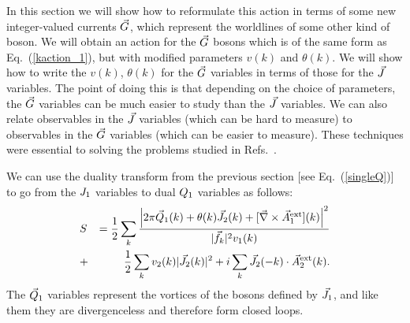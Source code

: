 In this section we will show how to reformulate this action in terms of some new integer-valued currents $\vec{G}$, which represent the worldlines of some other kind of boson. We will obtain an action for the $\vec{G}$ bosons which is of the same form as Eq.~(\ref{kaction_1}), but with modified parameters $v(k)$ and $\theta(k)$. We will show how to write the $v(k)$, $\theta(k)$ for the $\vec{G}$ variables in terms of those for the $\vec{J}$ variables. The point of doing this is that depending on the choice of parameters, the $\vec{G}$ variables can be much easier to study than the $\vec{J}$ variables. We can also relate observables in the $\vec{J}$ variables (which can be hard to measure) to observables in the $\vec{G}$ variables (which can be easier to measure). These techniques were essential to solving the problems studied in Refs.~\cite{short_range3,Gen2Loops,FQHE}.

We can use the duality transform from the previous section [see Eq.~(\ref{singleQ})] to go from the $J_1$ variables to dual $Q_1$ variables as follows:
\begin{eqnarray}
&S&=\frac{1}{2}\sum_k \frac{\left|2\pi\vec{Q}_1(k)+\theta(k)\vec{J}_2(k)+[\vec{\nabla}\times\vec{A}_{1}^{\rm ext}](k)\right|^2}{|\vec{f}_k|^2v_1(k)}\nonumber\\
&+&\frac{1}{2}\sum_k v_2(k)|\vec{J}_2(k)|^2 + i \sum_k \vec{J}_2(-k) \cdot \vec{A}_{2}^{\rm ext}(k).
\label{JQ1}
\end{eqnarray}
The $\vec{Q}_1$ variables represent the vortices of the bosons defined by $\vec{J}_1$, and like them they are divergenceless and therefore form closed loops.

